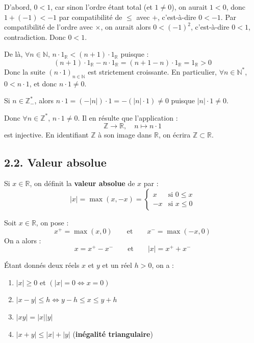 \documentclass[a4paper,11pt]{article}
\newcommand{\R}{\mathbb{R}}
\newcommand{\N}{\mathbb{N}}
\newcommand{\Z}{\mathbb{Z}}
\newcommand{\mot}[1]{\textcolor{bordeaux}{\textbf{#1}}}
\begin{document}
\begin{demonstration}
D'abord, $0 < 1$, car sinon l'ordre étant total (et $1 \neq 0$), on aurait $1 < 0$, donc $1 + (-1) < -1$ par compatibilité de $\le$ avec $+$, c'est-à-dire $0 < -1$. Par compatibilité de l'ordre avec $\times$, on aurait alors $0 < (-1)^2$, c'est-à-dire $0 < 1$, contradiction. Donc $0 < 1$.

De là, $\forall n \in \N$, $n \cdot 1_\R < (n + 1) \cdot 1_\R$ puisque :
\[
(n + 1) \cdot 1_\R - n \cdot 1_\R = (n + 1 - n) \cdot 1_\R = 1_\R > 0
\]
Donc la suite $(n \cdot 1)_{n \in \N}$ est strictement croissante. En particulier, $\forall n \in \N^*$, $0 < n \cdot 1$, et donc $n \cdot 1 \neq 0$.

Si $n \in \Z_-^*$, alors $n \cdot 1 = (-|n|) \cdot 1 = -(|n| \cdot 1) \neq 0$ puisque $|n| \cdot 1 \neq 0$.

Donc $\forall n \in \Z^*$, $n \cdot 1 \neq 0$. Il en résulte que l'application :
\[
\Z \longrightarrow \R, \quad n \longmapsto n \cdot 1
\]
est injective. En identifiant $\Z$ à son image dans $\R$, on écrira $\Z \subset \R$.
\end{demonstration}

\newpage
\subsection{2.2. Valeur absolue}

\begin{definition}
Si $x \in \R$, on définit la \mot{valeur absolue} de $x$ par :
\[
|x| = \max(x, -x) = \begin{cases} x & \text{si } 0 \le x \\ -x & \text{si } x \le 0 \end{cases}
\]
\end{definition}

\begin{exemples}
Soit $x \in \R$, on pose :
\[
x^+ = \max(x, 0) \qquad \text{et} \qquad x^- = \max(-x, 0)
\]
On a alors :
\[
x = x^+ - x^- \qquad \text{et} \qquad |x| = x^+ + x^-
\]
\end{exemples}

\begin{proposition}
Étant donnés deux réels $x$ et $y$ et un réel $h > 0$, on a :
\begin{enumerate}
    \item $|x| \ge 0$ et $(|x| = 0 \iff x = 0)$
    \item $|x - y| \le h \iff y - h \le x \le y + h$
    \item $|xy| = |x||y|$
    \item $|x + y| \le |x| + |y|$ \quad (\mot{inégalité triangulaire})
\end{enumerate}
\end{proposition}
\end{document}
